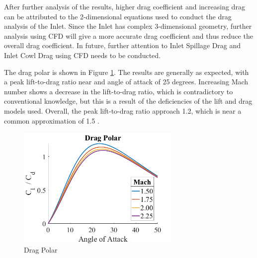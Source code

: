 After further analysis of the results, higher drag coefficient and increasing drag  can be attributed to the 2-dimensional equations used to conduct the drag analysis of the Inlet. Since the Inlet has complex 3-dimensional geometry, further analysis using CFD will give a more accurate drag coefficient and thus reduce the overall drag coefficient. In future, further attention to Inlet Spillage Drag and Inlet Cowl Drag using CFD needs to be conducted. 

The drag polar is shown in Figure \ref{fig:dragPolar}. The results are generally as expected, with a peak lift-to-drag ratio near and angle of attack of 25 degrees. Increasing Mach number shows a decrease in the lift-to-drag ratio, which is contradictory to conventional knowledge, but this is a result of the deficiencies of the lift and drag models used. Overall, the peak lift-to-drag ratio approach 1.2, which is near a common approximation of 1.5 \cite{fleeman_2001}. 

\begin{figure}[H]
    \centering
    \includegraphics[width=0.7\textwidth]{LiftAndDragAnalysis/figures/DragPolar.png}
    \caption{Drag Polar}
    \label{fig:dragPolar}
\end{figure}

